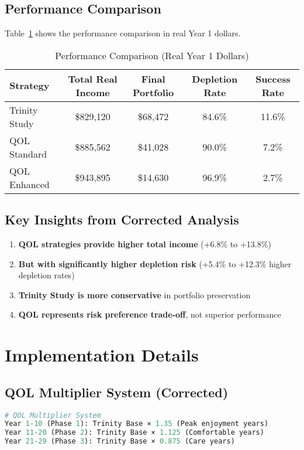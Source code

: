 \documentclass[11pt,letterpaper]{article}
\begin{document}
\subsection{Performance Comparison}
Table~\ref{tab:performance} shows the performance comparison in real Year 1 dollars.

\begin{table}[h!]
\centering
\begin{tabular}{@{}lcccc@{}}
\toprule
\textbf{Strategy} & \textbf{Total Real Income} & \textbf{Final Portfolio} & \textbf{Depletion Rate} & \textbf{Success Rate} \\
\midrule
Trinity Study & \$829,120 & \$68,472 & 84.6\% & 11.6\% \\
QOL Standard & \$885,562 & \$41,028 & 90.0\% & 7.2\% \\
QOL Enhanced & \$943,895 & \$14,630 & 96.9\% & 2.7\% \\
\bottomrule
\end{tabular}
\caption{Performance Comparison (Real Year 1 Dollars)}
\label{tab:performance}
\end{table}

\subsection{Key Insights from Corrected Analysis}
\begin{enumerate}
    \item \textbf{QOL strategies provide higher total income} (+6.8\% to +13.8\%)
    \item \textbf{But with significantly higher depletion risk} (+5.4\% to +12.3\% higher depletion rates)
    \item \textbf{Trinity Study is more conservative} in portfolio preservation
    \item \textbf{QOL represents risk preference trade-off}, not superior performance
\end{enumerate}

\section{Implementation Details}

\subsection{QOL Multiplier System (Corrected)}
\begin{lstlisting}[language=Python, caption=QOL Multiplier Implementation]
# QOL Multiplier System
Year 1-10 (Phase 1): Trinity Base × 1.35 (Peak enjoyment years)
Year 11-20 (Phase 2): Trinity Base × 1.125 (Comfortable years)  
Year 21-29 (Phase 3): Trinity Base × 0.875 (Care years)
\end{lstlisting}
\end{document}
